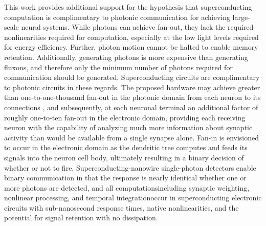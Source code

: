 \documentclass[twocolumn]{article}
\begin{document}
This work provides additional support for the hypothesis that superconducting computation is complimentary to photonic communication for achieving large-scale neural systems. While photons can achieve fan-out, they lack the required nonlinearities required for computation, especially at the low light levels required for energy efficiency. Further, photon motion cannot be halted to enable memory retention. Additionally, generating photons is more expensive than generating fluxons, and therefore only the minimum number of photons required for communication should be generated. Superconducting circuits are complimentary to photonic circuits in these regards. The proposed hardware may achieve greater than one-to-one-thousand fan-out in the photonic domain from each neuron to its connections \cite{sh2018_ICRC}, and subsequently, at each neuronal terminal an additional factor of roughly one-to-ten fan-out in the electronic domain, providing each receiving neuron with the capability of analyzing much more information about synaptic activity than would be available from a single synapse alone. Fan-in is envisioned to occur in the electronic domain as the dendritic tree computes and feeds its signals into the neuron cell body, ultimately resulting in a binary decision of whether or not to fire. Superconducting-nanowire single-photon detectors enable binary communication in that the response is nearly identical whether one or more photons are detected, and all computations\textemdash including synaptic weighting, nonlinear processing, and temporal integration\textemdash occur in superconducting electronic circuits with sub-nanosecond response times, native nonlinearities, and the potential for signal retention with no dissipation.
 
\end{document}
